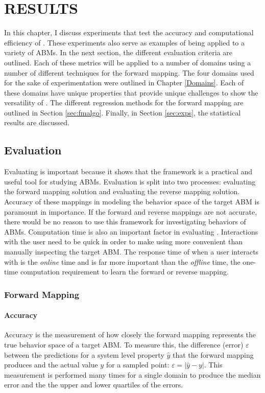\chapter{RESULTS}
\thispagestyle{plain}

\label{Results}

In this chapter, I discuss experiments that test the  accuracy and computational efficiency of \fw.
These experiments also serve as examples of \fw being applied to a variety of ABMs.
In the next section, the different evaluation criteria are outlined.
Each of these metrics will be applied to a number of domains using a number of different techniques for the forward mapping.
The four domains used for the sake of experimentation were outlined in Chapter \ref{Domains}.
Each of these domains have unique properties that provide unique challenges to show the versatility of \fw.
The different regression methods for the forward mapping are outlined in Section \ref{sec:fmalgo}.
Finally, in Section \ref{sec:exps}, the statistical results are discussed.

\section{Evaluation}

Evaluating \fw is important because it shows that the framework is a practical and useful tool for studying ABMs.
Evaluation is split into two processes: evaluating the forward mapping solution and evaluating the reverse mapping solution.
Accuracy of these mappings in modeling the behavior space of the target ABM is paramount in importance.
If the forward and reverse mappings are not accurate, there would be no reason to use this framework for investigating behaviors of ABMs.
Computation time is also an important factor in evaluating \fw.
Interactions with the user need to be quick in order to make using \fw more convenient than manually inspecting the target ABM.
The response time of when a user interacts with \fw is the \textit{online} time and is far more important than the \textit{offline} time, the one-time computation requirement to learn the forward or reverse mapping.


 \subsection{Forward Mapping}

  \subsubsection{Accuracy}
Accuracy is the measurement of how closely the forward mapping represents the true behavior space of a target ABM.
To measure this, the difference (error) $\varepsilon$ between the predictions for a system level property $\hat y$ that the forward mapping produces and the actual value $y$ for a sampled point: $\varepsilon = |\hat y - y|$.
This measurement is performed many times for a single domain to produce the median error and the the upper and lower quartiles of the errors.

